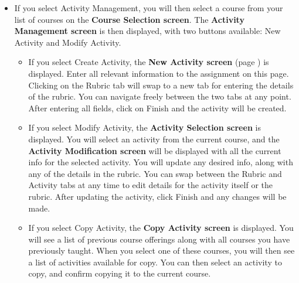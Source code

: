 \documentclass{article}
\begin{document}
\begin{itemize}
\begin{itemize}
\begin{itemize}
	\end{itemize}
      \item If you select Activity Management, you will then select a course from your
	list of courses on the \textbf{Course Selection screen}. The \textbf{Activity 
	  Management screen} is then displayed, with two buttons available: New 
	Activity and Modify Activity.
	\begin{itemize}
	\item If you select Create Activity, the \textbf{New Activity screen} 
	  (page \pageref{newActivity}) is displayed.
	  Enter all relevant information to the assignment on this page. Clicking on
	  the Rubric tab will swap to a new tab for entering the details of the rubric.
	  You can navigate freely between the two tabs at any point. After entering
	  all fields, click on Finish and the activity will be created.
	\item If you select Modify Activity, the \textbf{Activity Selection screen} is
	  displayed. You will select an activity from the current course, and the
	  \textbf{Activity Modification screen} will be displayed with all the current
	  info for the selected activity. You will update any desired info, along with
	  any of the details in the rubric. You can swap between the Rubric and 
	  Activity tabs at any time to edit details for the activity itself or
          the rubric.
	  After updating the activity, click Finish and any changes will be made.
	\item If you select Copy Activity, the \textbf{Copy Activity screen}
          is displayed.
	  You will see a list of previous course offerings along with all courses you
	  have previously taught. When you select one of these courses, you will
	  then see a list of activities available for copy. You can then select an
	  activity to copy, and confirm copying it to the current course.
	\end{itemize}
    \end{itemize}
\end{itemize}
\end{document}
